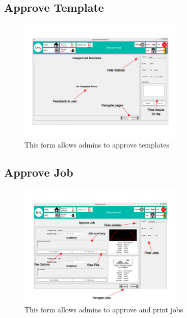 \documentclass[oneside,openany,11pt,a4paper]{report}
\begin{document}
\subsection{Approve Template}
\begin{figure}[H]
	\centering
	\includegraphics[width=0.7\textwidth]{screen/approvetemplate.png}
	\caption{This form allows admins to approve templates}
\end{figure}


\subsection{Approve Job}
\begin{figure}[H]
	\centering
	\includegraphics[width=0.7\textwidth]{screen/approvejobs.png}
	\caption{This form allows admins to approve and print jobs}
\end{figure}
\end{document}
